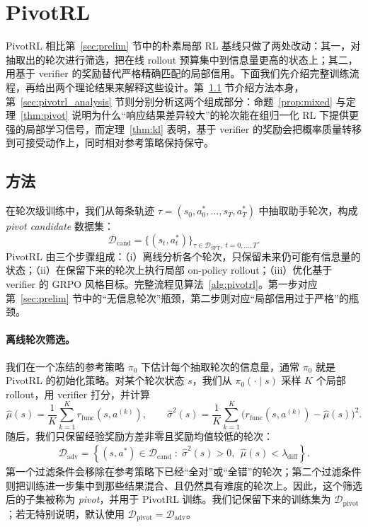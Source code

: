 

\section{PivotRL}
\label{sec:pivotrl}

PivotRL 相比第~\ref{sec:prelim} 节中的朴素局部 RL 基线只做了两处改动：其一，对抽取出的轮次进行筛选，把在线 rollout 预算集中到信息量更高的状态上；其二，用基于 verifier 的奖励替代严格精确匹配的局部信用。下面我们先介绍完整训练流程，再给出两个理论结果来解释这些设计。第~\ref{sec:pivotrl_method} 节介绍方法本身，第~\ref{sec:pivotrl_analysis} 节则分别分析这两个组成部分：命题~\ref{prop:mixed} 与定理~\ref{thm:pivot} 说明为什么“响应结果差异较大”的轮次能在组归一化 RL 下提供更强的局部学习信号，而定理~\ref{thm:kl} 表明，基于 verifier 的奖励会把概率质量转移到可接受动作上，同时相对参考策略保持保守。

\subsection{方法}
\label{sec:pivotrl_method}

在轮次级训练中，我们从每条轨迹 $\tau=(s_0,a_0^*,\ldots,s_T,a_T^*)$ 中抽取助手轮次，构成 \emph{pivot candidate} 数据集：
\begin{equation}
\mathcal{D}_{\mathrm{cand}}=\{(s_t,a_t^*)\}_{\tau \in \mathcal{D}_{\mathrm{SFT}}, ~t = 0,\dots,T}.
\label{eq:cand}
\end{equation}
PivotRL 由三个步骤组成：（i）离线分析各个轮次，只保留未来仍可能有信息量的状态；（ii）在保留下来的轮次上执行局部 on-policy rollout；（iii）优化基于 verifier 的 GRPO 风格目标。完整流程见算法~\ref{alg:pivotrl}。第一步对应第~\ref{sec:prelim} 节中的“无信息轮次”瓶颈，第二步则对应“局部信用过于严格”的瓶颈。

\paragraph{离线轮次筛选。}
我们在一个冻结的参考策略 $\pi_0$ 下估计每个抽取轮次的信息量，通常 $\pi_0$ 就是 PivotRL 的初始化策略。对某个轮次状态 $s$，我们从 $\pi_0(\cdot\mid s)$ 采样 $K$ 个局部 rollout，用 verifier 打分，并计算
\begin{equation}
\hat{\mu}(s)
=
\frac{1}{K}\sum_{k=1}^K r_{\mathrm{func}}(s,a^{(k)}),
\qquad
\hat{\sigma}^2(s)
=
\frac{1}{K}\sum_{k=1}^K \bigl(r_{\mathrm{func}}(s,a^{(k)})-\hat{\mu}(s)\bigr)^2.
\label{eq:profile_stats}
\end{equation}
随后，我们只保留经验奖励方差非零且奖励均值较低的轮次：
\begin{align}
\mathcal{D}_{\mathrm{adv}}
=
\left\{
(s,a^*)\in \mathcal{D}_{\mathrm{cand}}
\;:\;
\hat{\sigma}^2(s)>0, ~~
\hat{\mu}(s)<\lambda_{\mathrm{diff}}
\right\}.
\label{eq:dadv}
\end{align}
第一个过滤条件会移除在参考策略下已经“全对”或“全错”的轮次；第二个过滤条件则把训练进一步集中到那些结果混合、且仍然具有难度的轮次上。因此，这个筛选后的子集被称为 \emph{pivot}，并用于 PivotRL 训练。我们记保留下来的训练集为 $\mathcal{D}_{\mathrm{pivot}}$；若无特别说明，默认使用 $\mathcal{D}_{\mathrm{pivot}}=\mathcal{D}_{\mathrm{adv}}$。

